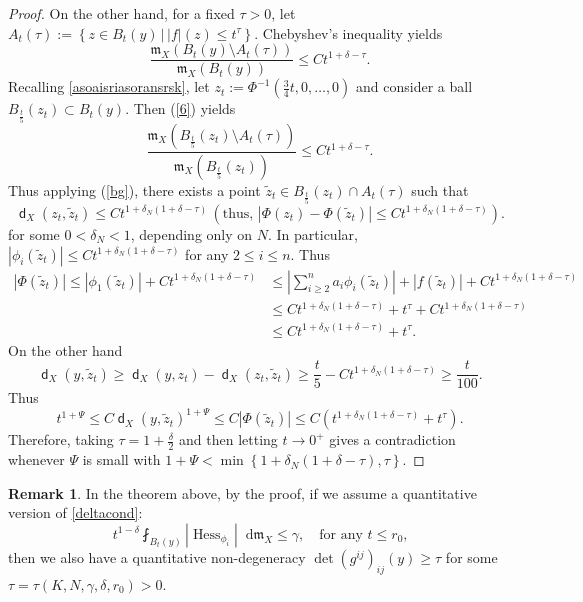 \documentclass[11pt,reqno]{amsart}
\theoremstyle{definition}
\newtheorem{remark}[theorem]{Remark}
\numberwithin{equation}{section}
\newcommand{\di}{\mathop{}\!\mathrm{d}}
\newcommand{\meas}{\mathfrak{m}}
\DeclareMathOperator{\dist}{\mathsf{d}}
\DeclareMathOperator{\Hess}{Hess}
\begin{document}
\begin{proof}
On the other hand, for a fixed $\tau>0$, let
$
A_t(\tau):=\left\{z \in B_t(y)\,|\, |f|(z) \le t^{\tau}\right\}.
$
Chebyshev's inequality yields
\begin{equation}\label{6}
\frac{\meas_X (B_t(y)\setminus A_t(\tau))}{\meas_X (B_t(y))} \le Ct^{1+\delta-\tau}.
\end{equation}
Recalling \eqref{asoaisriasoransrsk}, let
$
z_t:=\Phi^{-1}\left( \frac{3}{4}t, 0, \ldots, 0\right)
$
and consider a ball $B_{\frac{t}{5}}(z_t)\subset B_t(y)$. Then (\ref{6}) yields
\begin{equation}
\frac{\meas_X(B_{\frac{t}{5}}(z_t)\setminus A_t(\tau))}{\meas_X (B_{\frac{t}{5}}(z_t))} \le Ct^{1+\delta-\tau}.
\end{equation}
Thus applying (\ref{bg}), there exists a point $\tilde z_t \in B_{\frac{t}{5}}(z_t)\cap A_t(\tau)$ such that 
$$
\dist_X \left( z_t, \tilde  z_t\right) \le Ct^{1+\delta_N\left(1+\delta-\tau\right)}\,(\text{thus},\,\left| \Phi(z_t)-\Phi (\tilde z_t)\right|  \le  Ct^{1+\delta_N\left(1+\delta-\tau\right)}  ).
$$
for some $0<\delta_N<1$, depending only on $N$. 
In particular, 
$
\left| \phi_i(\tilde z_t)\right| \le Ct^{1+\delta_N\left(1+\delta-\tau\right)}$ for any $2 \le i \le n$. 
Thus
\begin{align}
\left| \Phi(\tilde z_t)\right| \le |\phi_1(\tilde z_t)| + Ct^{1+\delta_N\left(1+\delta-\tau\right)} 
&\le \left| \sum_{i \ge 2}^na_i\phi_i(\tilde z_t) \right| +|f(\tilde z_t)| + Ct^{1+\delta_N\left(1+\delta-\tau\right)} \nonumber \\
&\le Ct^{1+\delta_N\left(1+\delta-\tau\right)} + t^{\tau} + Ct^{1+\delta_N\left(1+\delta-\tau\right)} \nonumber \\
&\le Ct^{1+\delta_N\left(1+\delta-\tau\right)} + t^{\tau}. 
\end{align}
On the other hand
$$
\dist_X(y, \tilde z_t) \ge \dist_X(y, z_t) -\dist_X(z_t, \tilde z_t)  \ge \frac{t}{5}-Ct^{1+\delta_N\left(1+\delta-\tau\right)} \ge \frac{t}{100}.
$$
Thus
$$
t^{1+\Psi}\le C\dist_X(y, \tilde z_t)^{1+\Psi} \le C |\Phi (\tilde z_t)| \le C \left(t^{1+\delta_N\left(1+\delta-\tau\right)} +t^{\tau}\right).
$$
Therefore, taking $\tau=1+\frac{\delta}{2}$  and then letting $t \to 0^+$ gives a contradiction whenever $\Psi$ is small with
$
1+\Psi<\min \left\{1+\delta_N\left(1+\delta-\tau\right), \tau\right\}. 
$
\end{proof}
\begin{remark}\label{asansakkksksksksks}
In the theorem above, by the proof, if we assume a quantitative version of \eqref{deltacond}:
\begin{equation}
    t^{1- \delta}\fint_{B_t(y)}|\Hess_{\phi_i}|\di \meas_X \le \gamma,\quad \text{for any $t \le r_0$,}
\end{equation}
then we also have a quantitative non-degeneracy
$
\det(g^{ij})_{ij}(y)\ge \tau
$
for some $\tau=\tau(K, N, \gamma, \delta, r_0)>0$.
\end{remark}
\end{document}
